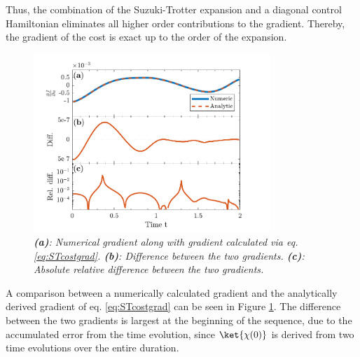 Thus, the combination of the Suzuki-Trotter expansion and a diagonal control Hamiltonian eliminates all higher order contributions to the gradient. Thereby, the gradient of the cost is exact up to the order of the expansion.
\begin{figure}[!h]
    \centering
    \includegraphics[width=0.8\textwidth]{Figures/CompareGradientsGRAPE.pdf}
    \caption{\textit{\textbf{(a)}: Numerical gradient along with gradient calculated via eq. \eqref{eq:STcostgrad}. \textbf{(b)}: Difference between the two gradients. \textbf{(c)}: Absolute relative difference between the two gradients.}}
    \label{fig:CompareGradientsGRAPE}
\end{figure}
A comparison between a numerically calculated gradient and the analytically derived gradient of eq. \eqref{eq:STcostgrad} can be seen in Figure \ref{fig:CompareGradientsGRAPE}. The difference between the two gradients is largest at the beginning of the sequence, due to the accumulated error from the time evolution, since $\ket{\chi (0)}$ is derived from two time evolutions over the entire duration.


